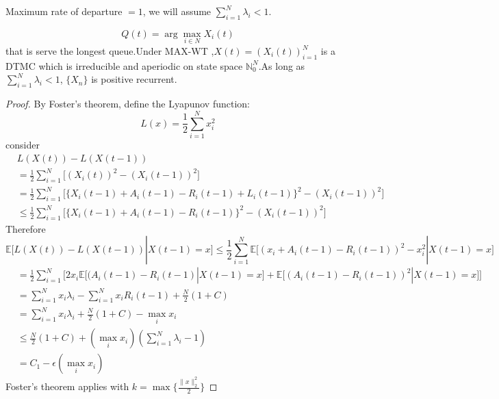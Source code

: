 \documentclass[a4paper,10pt,english]{article}
\begin{document}
Maximum rate of departure $= 1$, we will assume $ \sum_{i=1}^{N} \lambda _i < 1$.
\begin{thm}
\[Q(t) = \arg \max _{i \in N} X_i(t)  \] 
that is serve  the longest queue.Under MAX-WT ,$X(t) = (X_i(t))_{i=1}^{N}$ is a DTMC which is irreducible and aperiodic on state space $\mathbb{N}_0^N$.As long as $\sum_{i=1}^{N} \lambda _i < 1$, $\{X_n\}$ is positive recurrent.
\end{thm}
\begin{proof}
By Foster's theorem, define the Lyapunov function:
\[L(x) = \frac{1}{2} \sum_{i=1}^{N}x_i^2\] consider
\begin{align*}
& L(X(t)) - L(X(t-1))\\
&= \frac{1}{2} \sum_{i=1}^{N}\Big[ (X_i(t))^2 - (X_i(t-1))^2 \Big]\\
&= \frac{1}{2} \sum_{i=1}^{N}\Big[ \{X_i(t-1) + A_i(t-1) - R_i(t-1) + L_i(t-1)\}^2 - (X_i(t-1))^2 \Big]\\
& \leq \frac{1}{2} \sum_{i=1}^{N}\Big[ \{X_i(t-1) + A_i(t-1) - R_i(t-1)\}^2 - (X_i(t-1))^2 \Big]
\end{align*}
Therefore 
\[\mathbb{E}\Big[ L(X(t)) - L(X(t-1)) | X(t-1) = x \Big]  \leq \frac{1}{2} \sum_{i=1}^{N} \mathbb{E} \Big[ (x_i + A_i(t-1) - R_i(t-1))^2 - x_i^2 | X(t-1) = x \Big]\]
\begin{align*}
&= \frac{1}{2} \sum_{i=1}^{N} \Bigg[ 2x_i \mathbb{E} \Big[ (A_i(t-1) - R_i(t-1)| X(t-1) = x \Big] + \mathbb{E} \Big[ (A_i(t-1) - R_i(t-1))^2 | X(t-1) = x \Big] \Bigg]\\
&= \sum_{i=1}^{N}x_i \lambda _i - \sum_{i=1}^{N}x_i R_i(t-1) + \frac{N}{2}(1+C)\\
&= \sum_{i=1}^{N}x_i \lambda _i + \frac{N}{2}(1+C) - \max _i x_i\\
& \leq \frac{N}{2}(1+C) + (\max _i x_i)(\sum_{i=1}^{N} \lambda _i - 1)\\
&= C_1 - \epsilon (\max _i x_i)
\end{align*}
Foster's theorem applies with $k = \max \{\frac{\|x\|_2 ^2}{2}\}$
\end{proof}
\end{document}
